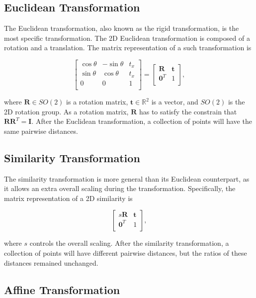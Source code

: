 \documentclass[11pt,twoside]{report}
\begin{document}
 \subsection{Euclidean Transformation}
 
 The Euclidean transformation, also known as the rigid transformation, is the most specific transformation. The 2D Euclidean transformation is composed of a rotation and a translation. The matrix representation of a such transformation is
 
$$
\begin{bmatrix}
	\cos\theta & -\sin\theta & t_{x}\\
	\sin\theta & \cos\theta & t_{x}\\
	0 & 0 & 1\\
\end{bmatrix} =
\begin{bmatrix}
	\mathbf{R} & \mathbf{t}\\
	\mathbf{0}^T & 1\\
\end{bmatrix},
$$

\noindent where $\mathbf{R} \in SO(2)$ is a rotation matrix, $\mathbf{t} \in \mathbb{R}^2$ is a vector, and $SO(2)$ is the 2D rotation group. As a rotation matrix, $\mathbf{R}$ has to satisfy the constrain that $\mathbf{R}\mathbf{R}^T = \mathbf{I}$. After the Euclidean transformation, a collection of points will have the same pairwise distances. 

\subsection{Similarity Transformation}

The similarity transformation is more general than its Euclidean counterpart, as it allows an extra overall scaling during the transformation. Specifically, the matrix representation of a 2D similarity is

$$
 \begin{bmatrix}
	s\mathbf{R} & \mathbf{t}\\
	\mathbf{0}^T & 1\\
\end{bmatrix},
$$

\noindent where $s$ controls the overall scaling. After the similarity transformation, a collection of points will have different pairwise distances, but the ratios of these distances remained unchanged.

\subsection{Affine Transformation}
\end{document}
